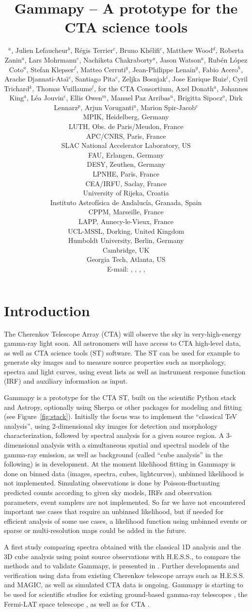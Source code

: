 \documentclass{PoS}
\title{Gammapy -- A prototype for the CTA science tools}
\author{
\speaker{Christoph Deil}$^a$,
Julien Lefaucheur$^b$,
R\'egis Terrier$^c$,
Bruno Kh\'elifi$^c$,
Matthew Wood$^d$,
Roberta Zanin$^a$,
Lars Mohrmann$^e$,
Nachiketa Chakraborty$^a$,
Jason Watson$^a$,
Rub\'en L\'opez Coto$^a$,
Stefan Klepser$^f$,
Matteo Cerruti$^g$,
Jean-Philippe Lenain$^g$,
Fabio Acero$^h$,
Arache Djannati-Ata{\"\i}$^c$,
Santiago Pita$^c$,
Zeljka Bosnjak$^i$,
Jose Enrique Ruiz$^j$,
Cyril Trichard$^k$,
Thomas Vuillaume$^l$,
for the CTA Consortium,
Axel Donath$^a$,
Johannes King$^a$,
L\'ea Jouvin$^c$,
Ellis Owen$^m$,
Manuel Paz Arribas$^n$,
Brigitta Sipocz$^o$,
Dirk Lennarz$^p$,
Arjun Voruganti$^a$,
Marion Spir-Jacob$^c$
\\
\llap{$^a$}MPIK, Heidelberg, Germany\\
\llap{$^b$}LUTH, Obs. de Paris/Meudon, France\\
\llap{$^c$}APC/CNRS, Paris, France\\
\llap{$^d$}SLAC National Accelerator Laboratory, US\\
\llap{$^e$}FAU, Erlangen, Germany\\
\llap{$^f$}DESY, Zeuthen, Germany\\
\llap{$^g$}LPNHE, Paris, France\\
\llap{$^h$}CEA/IRFU, Saclay, France\\
\llap{$^i$}University of Rijeka, Croatia\\
\llap{$^j$}Instituto Astrof\'isica de Andaluc\'ia, Granada, Spain\\
\llap{$^k$}CPPM, Marseille, France\\
\llap{$^l$}LAPP, Annecy-le-Vieux, France\\
\llap{$^m$}UCL-MSSL, Dorking, United Kingdom\\
\llap{$^n$}Humboldt University, Berlin, Germany\\
\llap{$^o$}Cambridge, UK\\
\llap{$^p$}Georgia Tech, Atlanta, US\\
E-mail:
\email{Christoph.Deil@mpi-hd.mpg.de},
\email{julien.lefaucheur@obspm.fr},
\email{Roberta.Zanin@mpi-hd.mpg.de},
\email{khelifi@apc.in2p3.fr},
}
\begin{document}
\section{Introduction}
\label{sec:intro}

The Cherenkov Telescope Array (CTA) will observe the sky in very-high-energy
gamma-ray light soon. All astronomers will have access to CTA high-level data,
as well as CTA science tools (ST) software. The ST can be used for example to
generate sky images and to measure source properties such as morphology, spectra
and light curves, using event lists as well as instrument response function
(IRF) and auxiliary information as input.

Gammapy is a prototype for the CTA ST, built on the scientific Python stack and
Astropy, optionally using Sherpa or other packages for modeling and fitting (see
Figure~\ref{fig:stack}). Initially the focus was to implement the ``classical
TeV analysis'', using 2-dimensional sky images for detection and morphology
characterization, followed by spectral analysis for a given source region. A
3-dimensional analysis with a simultaneous spatial and spectral models of the
gamma-ray emission, as well as background (called ``cube analysis'' in the
following) is in development. At the moment likelihood fitting in Gammapy is
done on binned data (images, spectra, cubes, lightcurves), unbinned likelihood
is not implemented. Simulating observations is done by Poisson-fluctuating
predicted counts according to given sky models, IRFs and observation parameters,
event samplers are not implemented. So far we have not encountered important use
cases that require an unbinned likelihood, but if needed for efficient analysis
of some use cases, a likelihood function using unbinned events or sparse or
multi-resolution maps could be added in the future.

A first study comparing spectra obtained with the classical 1D analysis and the
3D cube analysis using point source observations with H.E.S.S., to compare the
methods and to validate Gammapy, is presented in \cite{lea}. Further
developments and verification using data from existing Cherenkov telescope
arrays such as H.E.S.S. and MAGIC, as well as simulated CTA data is ongoing.
Gammapy is starting to be used for scientific studies for existing ground-based
gamma-ray telescopes \cite{hgps, shells}, the Fermi-LAT space telescope
\cite{owen2015}, as well as for CTA \cite{julien, roberta, cyril}.
\end{document}
